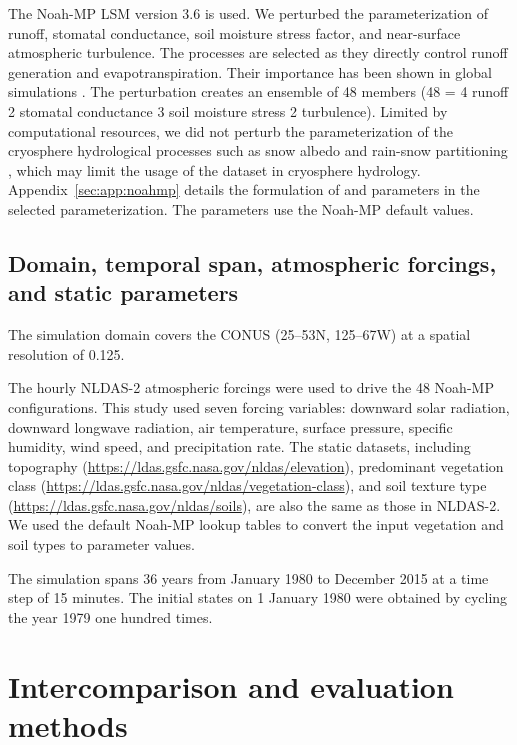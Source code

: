 \documentclass[essd, manuscript]{copernicus}
\begin{document}
The Noah-MP LSM version 3.6 is used. We perturbed the parameterization of runoff, stomatal conductance, soil moisture stress factor, and near-surface atmospheric turbulence. The processes are selected as they directly control runoff generation and evapotranspiration. Their importance has been shown in global simulations \citep{yang2011JGRA}. The perturbation creates an ensemble of 48 members (48 = 4 runoff \times{} 2 stomatal conductance \times{} 3 soil moisture stress \times{} 2 turbulence). Limited by computational resources, we did not perturb the parameterization of the cryosphere hydrological processes such as snow albedo \citep{chen2014JGRA,he2019JGRA} and rain-snow partitioning \citep{wang2019GRL}, which may limit the usage of the dataset in cryosphere hydrology. Appendix~\ref{sec:app:noahmp} details the formulation of and parameters in the selected parameterization. The parameters use the Noah-MP default values.

\subsection{Domain, temporal span, atmospheric forcings, and static parameters}\label{sec:data:static}

The simulation domain covers the CONUS (25\degree{}--53\degree{}N, 125\degree{}--67\degree{}W) at a spatial resolution of 0.125\degree{}.

The hourly NLDAS-2 atmospheric forcings were used to drive the 48 Noah-MP configurations. This study used seven forcing variables: downward solar radiation, downward longwave radiation, air temperature, surface pressure, specific humidity, wind speed, and precipitation rate. The static datasets, including topography (\url{https://ldas.gsfc.nasa.gov/nldas/elevation}), predominant vegetation class (\url{https://ldas.gsfc.nasa.gov/nldas/vegetation-class}), and soil texture type (\url{https://ldas.gsfc.nasa.gov/nldas/soils}), are also the same as those in NLDAS-2. We used the default Noah-MP lookup tables to convert the input vegetation and soil types to parameter values.

The simulation spans 36 years from January 1980 to December 2015 at a time step of 15 minutes. The initial states on 1 January 1980 were obtained by cycling the year 1979 one hundred times.

\section{Intercomparison and evaluation methods}\label{sec:methods}
\end{document}
